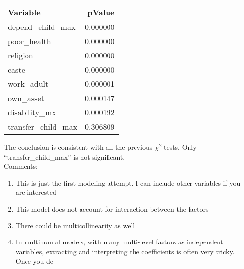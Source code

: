 \documentclass[11pt]{article}
\begin{document}
\begin{table}[ht]
\centering
\begin{tabular}{lr}
  \hline
Variable & pValue \\ 
  \hline
depend\_child\_max & 0.000000 \\ 
  poor\_health & 0.000000 \\ 
  religion & 0.000000 \\ 
  caste & 0.000000 \\ 
  work\_adult & 0.000001 \\ 
  own\_asset & 0.000147 \\ 
  disability\_mx & 0.000192 \\ 
  transfer\_child\_max & 0.306809 \\ 
   \hline
\end{tabular}
\end{table}
The conclusion is consistent with all the previous $\chi^2$ tests. Only ``transfer\_child\_max'' is not significant. 
\\
Comments:
\begin{enumerate}
\item This is just the first modeling attempt. I can include other variables if you are interested
\item This model does not account for interaction between the factors
\item There could be multicollinearity as well
\item In multinomial models, with many multi-level factors as independent variables, extracting and interpreting the coefficients is often very tricky. Once you de 
\end{enumerate}
\end{document}
